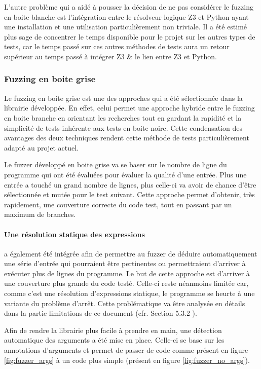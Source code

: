 \documentclass[a4paper]{report}
\begin{document}
L'autre problème qui a aidé à pousser la décision de ne pas considérer le fuzzing en boite blanche est l'intégration entre le résolveur logique Z3 et Python ayant une installation et une utilisation particulièrement non triviale.
Il a été estimé plus sage de concentrer le temps disponible pour le projet sur les autres types de tests, car le temps passé sur ces autres méthodes de tests aura un retour supérieur au temps passé à intégrer Z3 \& le lien entre Z3 et Python.

\subsubsection{Fuzzing en boite grise}

Le fuzzing en boite grise est une des approches qui a été sélectionnée dans la librairie développée.
En effet, celui permet une approche hybride entre le fuzzing en boite branche en orientant les recherches tout en gardant la rapidité et la simplicité de tests inhérente aux tests en boite noire.
Cette condensation des avantages des deux techniques rendent cette méthode de tests particulièrement adapté au projet actuel.

Le fuzzer développé en boite grise va se baser sur le nombre de ligne du programme qui ont été évaluées pour évaluer la qualité d'une entrée.
Plus une entrée a touché un grand nombre de lignes, plus celle-ci va avoir de chance d'être sélectionnée et mutée  pour le test suivant.
Cette approche permet d'obtenir, très rapidement, une couverture correcte du code test, tout en passant par un maximum de branches.

\paragraph{Une résolution statique des expressions} a également été intégrée afin de permettre au fuzzer de déduire automatiquement une série d'entrée qui pourraient être pertinentes ou permettraient d'arriver à exécuter plus de lignes du programme.
Le but de cette approche est d'arriver à une couverture plus grande du code testé.
Celle-ci reste néanmoins limitée car, comme c'est une résolution d'expressions statique, le programme se heurte à une variante du problème d'arrêt.
Cette problématique va être analysée en détails dans la partie limitations de ce document (cfr. Section 5.3.2 ).

Afin de rendre la librairie plus facile à prendre en main, une détection automatique des arguments a été mise en place.
Celle-ci se base sur les annotations d’arguments et permet de passer de code comme présent en figure \ref{fig:fuzzer_args} à un code plus simple (présent en figure \ref{fig:fuzzer_no_args}).
\end{document}
